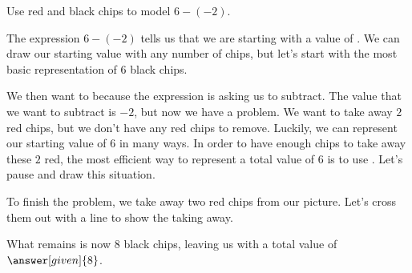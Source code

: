 \documentclass{ximera}
\begin{document}
\begin{problem}
Use red and black chips to model $6 - (-2)$.

\begin{explanation}
The expression $6 - (-2)$ tells us that we are starting with a value of . We can draw our starting value with any number of chips, but let's start with the most basic representation of $6$ black chips.

\begin{image}
\end{image}


We then want to  because the expression is asking us to subtract. The value that we want to subtract is $-2$, but now we have a problem. We want to take away $2$ red chips, but we don't have any red chips to remove. Luckily, we can represent our starting value of $6$ in many ways. In order to have enough chips to take away these $2$ red, the most efficient way to represent a total value of $6$ is to use . Let's pause and draw this situation.

\begin{image}
\end{image}

To finish the problem, we take away two red chips from our picture. Let's cross them out with a line to show the taking away.
\begin{image}
\end{image}

What remains is now $8$ black chips, leaving us with a total value of $\answer[given]{8}$.
\end{explanation}
\end{problem}
\end{document}
